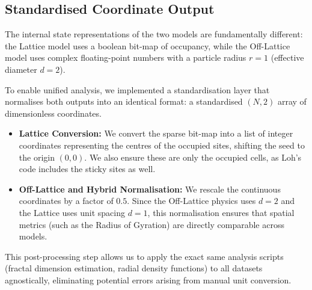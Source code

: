 \documentclass[12pt, a4paper, oneside]{report}
\theoremstyle{remark}
\begin{document}
\subsection{Standardised Coordinate Output}
The internal state representations of the two models are fundamentally different: the Lattice model uses a boolean bit-map of occupancy, while the Off-Lattice model uses complex floating-point numbers with a particle radius $r=1$ (effective diameter $d=2$).

To enable unified analysis, we implemented a standardisation layer that normalises both outputs into an identical format: a standardised $(N, 2)$ array of dimensionless coordinates.

\begin{itemize}
    \item \textbf{Lattice Conversion:} We convert the sparse bit-map into a list of integer coordinates representing the centres of the occupied sites, shifting the seed to the origin $(0,0)$. We also ensure these are only the occupied cells, as Loh's code includes the sticky sites as well.
    \item \textbf{Off-Lattice and Hybrid Normalisation:} We rescale the continuous coordinates by a factor of $0.5$. Since the Off-Lattice physics uses $d=2$ and the Lattice uses unit spacing $d=1$, this normalisation ensures that spatial metrics (such as the Radius of Gyration) are directly comparable across models.
\end{itemize}

This post-processing step allows us to apply the exact same analysis scripts (fractal dimension estimation, radial density functions) to all datasets agnostically, eliminating potential errors arising from manual unit conversion.



\end{document}
